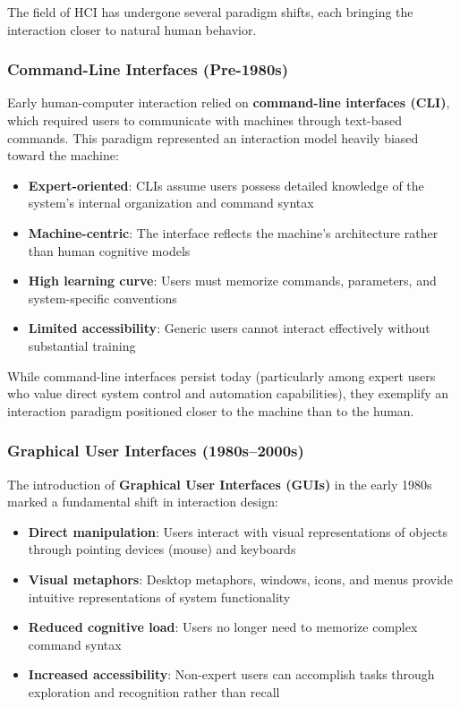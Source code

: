 \documentclass[11pt,a4paper]{article}
\theoremstyle{definition}
\theoremstyle{plain}
\theoremstyle{remark}
\begin{document}
The field of HCI has undergone several paradigm shifts, each bringing the interaction closer to natural human behavior.

\subsubsection{Command-Line Interfaces (Pre-1980s)}

\begin{tcolorbox}[colback=green!5!white,colframe=green!75!black,title=\textbf{Command-Line Interfaces (CLI)}]
Early human-computer interaction relied on \textbf{command-line interfaces (CLI)}, which required users to communicate with machines through text-based commands. This paradigm represented an interaction model heavily biased toward the machine:
\begin{itemize}
    \item \textbf{Expert-oriented}: CLIs assume users possess detailed knowledge of the system's internal organization and command syntax
    \item \textbf{Machine-centric}: The interface reflects the machine's architecture rather than human cognitive models
    \item \textbf{High learning curve}: Users must memorize commands, parameters, and system-specific conventions
    \item \textbf{Limited accessibility}: Generic users cannot interact effectively without substantial training
\end{itemize}
\end{tcolorbox}

While command-line interfaces persist today (particularly among expert users who value direct system control and automation capabilities), they exemplify an interaction paradigm positioned closer to the machine than to the human.

\subsubsection{Graphical User Interfaces (1980s–2000s)}

\begin{tcolorbox}[colback=orange!5!white,colframe=orange!75!black,title=\textbf{Graphical User Interfaces (GUIs)}]
The introduction of \textbf{Graphical User Interfaces (GUIs)} in the early 1980s marked a fundamental shift in interaction design:
\begin{itemize}
    \item \textbf{Direct manipulation}: Users interact with visual representations of objects through pointing devices (mouse) and keyboards
    \item \textbf{Visual metaphors}: Desktop metaphors, windows, icons, and menus provide intuitive representations of system functionality
    \item \textbf{Reduced cognitive load}: Users no longer need to memorize complex command syntax
    \item \textbf{Increased accessibility}: Non-expert users can accomplish tasks through exploration and recognition rather than recall
\end{itemize}
\end{tcolorbox}
\end{document}
